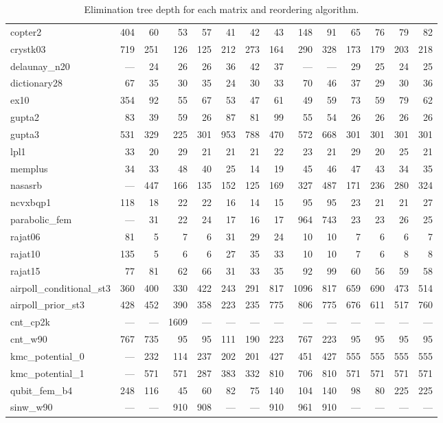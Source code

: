 \begin{sidewaystable}
{\begin{tabular}{ l r r r r r r r r r r r r r }
      copter2 & 404 & 60 & 53 & 57 & 41 & 42 & 43 & 148 & 91 & 65 & 76 & 79 & 82 \\
      crystk03 & 719 & 251 & 126 & 125 & 212 & 273 & 164 & 290 & 328 & 173 & 179 & 203 & 218 \\
      delaunay\_n20 & --- & 24 & 26 & 26 & 36 & 42 & 37 & --- & --- & 29 & 25 & 24 & 25 \\
      dictionary28 & 67 & 35 & 30 & 35 & 24 & 30 & 33 & 70 & 46 & 37 & 29 & 30 & 36 \\
      ex10 & 354 & 92 & 55 & 67 & 53 & 47 & 61 & 49 & 59 & 73 & 59 & 79 & 62 \\
      gupta2 & 83 & 39 & 59 & 26 & 87 & 81 & 99 & 55 & 54 & 26 & 26 & 26 & 26 \\
      gupta3 & 531 & 329 & 225 & 301 & 953 & 788 & 470 & 572 & 668 & 301 & 301 & 301 & 301 \\
      lpl1 & 33 & 20 & 29 & 21 & 21 & 21 & 22 & 23 & 21 & 29 & 20 & 25 & 21 \\
      memplus & 34 & 33 & 48 & 40 & 25 & 14 & 19 & 45 & 46 & 47 & 43 & 34 & 35 \\
      nasasrb & --- & 447 & 166 & 135 & 152 & 125 & 169 & 327 & 487 & 171 & 236 & 280 & 324 \\
      ncvxbqp1 & 118 & 18 & 22 & 22 & 16 & 14 & 15 & 95 & 95 & 23 & 21 & 21 & 27 \\
      parabolic\_fem & --- & 31 & 22 & 24 & 17 & 16 & 17 & 964 & 743 & 23 & 23 & 26 & 25 \\
      rajat06 & 81 & 5 & 7 & 6 & 31 & 29 & 24 & 10 & 10 & 7 & 6 & 6 & 7 \\
      rajat10 & 135 & 5 & 6 & 6 & 27 & 35 & 33 & 10 & 10 & 7 & 6 & 8 & 8 \\
      rajat15 & 77 & 81 & 62 & 66 & 31 & 33 & 35 & 92 & 99 & 60 & 56 & 59 & 58 \\
      airpoll\_conditional\_st3 & 360 & 400 & 330 & 422 & 243 & 291 & 817 & 1096 & 817 & 659 & 690 & 473 & 514 \\
      airpoll\_prior\_st3 & 428 & 452 & 390 & 358 & 223 & 235 & 775 & 806 & 775 & 676 & 611 & 517 & 760 \\
      cnt\_cp2k & --- & --- & 1609 & --- & --- & --- & --- & --- & --- & --- & --- & --- & --- \\
      cnt\_w90 & 767 & 735 & 95 & 95 & 111 & 190 & 223 & 767 & 223 & 95 & 95 & 95 & 95 \\
      kmc\_potential\_0 & --- & 232 & 114 & 237 & 202 & 201 & 427 & 451 & 427 & 555 & 555 & 555 & 555 \\
      kmc\_potential\_1 & --- & 571 & 571 & 287 & 383 & 332 & 810 & 706 & 810 & 571 & 571 & 571 & 571 \\
      qubit\_fem\_b4 & 248 & 116 & 45 & 60 & 82 & 75 & 140 & 104 & 140 & 98 & 80 & 225 & 225 \\
      sinw\_w90 & --- & --- & 910 & 908 & --- & --- & 910 & 961 & 910 & --- & --- & --- & --- \\
      \bottomrule
    \end{tabular}
    }%
    \caption{Elimination tree depth for each matrix and reordering algorithm.}%
    \label{tbl:elimination_tree_depth_results}
\end{sidewaystable}
